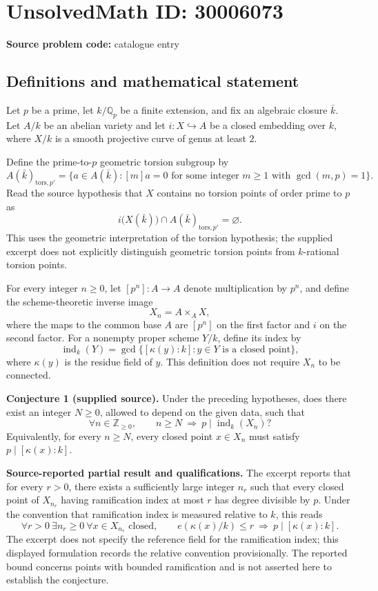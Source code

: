 \documentclass[11pt]{article}
\newcommand{\Z}{\mathbb{Z}}
\newcommand{\Q}{\mathbb{Q}}
\begin{document}
\section*{UnsolvedMath ID: 30006073}
\textbf{Source problem code:} catalogue entry
\subsection{Definitions and mathematical statement}
Let \(p\) be a prime, let \(k/\Q_p\) be a finite extension, and fix an algebraic closure \(\bar k\). Let \(A/k\) be an abelian variety and let \(i:X\hookrightarrow A\) be a closed embedding over \(k\), where \(X/k\) is a smooth projective curve of genus at least \(2\).

Define the prime-to-\(p\) geometric torsion subgroup by
\[
A(\bar k)_{\mathrm{tors},p'}
=\{a\in A(\bar k):[m]a=0\text{ for some integer }m\geq 1\text{ with }\gcd(m,p)=1\}.
\]
Read the source hypothesis that \(X\) contains no torsion points of order prime to \(p\) as
\[
i\bigl(X(\bar k)\bigr)\cap A(\bar k)_{\mathrm{tors},p'}=\varnothing.
\]
This uses the geometric interpretation of the torsion hypothesis; the supplied excerpt does not explicitly distinguish geometric torsion points from \(k\)-rational torsion points.

For every integer \(n\geq 0\), let \([p^n]:A\to A\) denote multiplication by \(p^n\), and define the scheme-theoretic inverse image
\[
X_n=A\mathop{\times}_{A}X,
\]
where the maps to the common base \(A\) are \([p^n]\) on the first factor and \(i\) on the second factor. For a nonempty proper scheme \(Y/k\), define its index by
\[
\operatorname{ind}_k(Y)
=\gcd\{[\kappa(y):k]:y\in Y\text{ is a closed point}\},
\]
where \(\kappa(y)\) is the residue field of \(y\). This definition does not require \(X_n\) to be connected.

\textbf{Conjecture 1 (supplied source).} Under the preceding hypotheses, does there exist an integer \(N\geq 0\), allowed to depend on the given data, such that
\[
\forall n\in\Z_{\geq 0},\qquad n\geq N\ \Longrightarrow\ p\mid\operatorname{ind}_k(X_n)?
\]
Equivalently, for every \(n\geq N\), every closed point \(x\in X_n\) must satisfy \(p\mid[\kappa(x):k]\).

\textbf{Source-reported partial result and qualifications.} The excerpt reports that for every \(r>0\), there exists a sufficiently large integer \(n_r\) such that every closed point of \(X_{n_r}\) having ramification index at most \(r\) has degree divisible by \(p\). Under the convention that ramification index is measured relative to \(k\), this reads
\[
\forall r>0\ \exists n_r\geq 0\ \forall x\in X_{n_r}\text{ closed},\qquad
 e(\kappa(x)/k)\leq r\ \Longrightarrow\ p\mid[\kappa(x):k].
\]
The excerpt does not specify the reference field for the ramification index; this displayed formulation records the relative convention provisionally. The reported bound concerns points with bounded ramification and is not asserted here to establish the conjecture.
\end{document}
